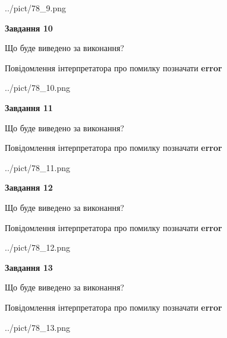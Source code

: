 \documentclass[11pt, ukrainian]{article}
\begin{document}
{\begin {large}
\begin{center}
	{../pict/78_9.png}
\end{center}
\newpage

{\begin {center}\textbf{Завдання 10}\end {center}}\par
Що буде виведено за виконання? \par
Повідомлення інтерпретатора про помилку позначати \textbf{error}

\begin{center}
	{../pict/78_10.png}
\end{center}
\newpage

{\begin {center}\textbf{Завдання 11}\end {center}}\par
Що буде виведено за виконання? \par
Повідомлення інтерпретатора про помилку позначати \textbf{error}

\begin{center}
	{../pict/78_11.png}
\end{center}
\newpage

{\begin {center}\textbf{Завдання 12}\end {center}}\par
Що буде виведено за виконання? \par
Повідомлення інтерпретатора про помилку позначати \textbf{error}

\begin{center}
	{../pict/78_12.png}
\end{center}
\newpage

{\begin {center}\textbf{Завдання 13}\end {center}}\par
Що буде виведено за виконання? \par
Повідомлення інтерпретатора про помилку позначати \textbf{error}

\begin{center}
	{../pict/78_13.png}
\end{center}
\newpage


\end{large}}
\end{document}
